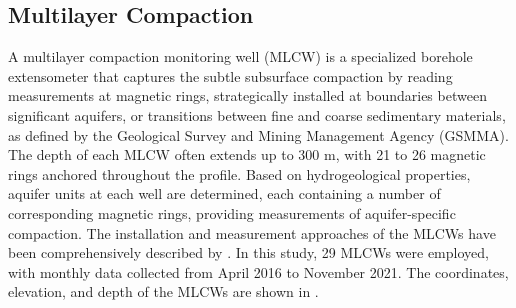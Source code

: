 
\subsection{Multilayer Compaction}
\label{subsubsec:mlcw}

A multilayer compaction monitoring well (MLCW) is a specialized borehole extensometer that captures the subtle subsurface compaction by reading measurements at magnetic rings, strategically installed at boundaries between significant aquifers, or transitions between fine and coarse sedimentary materials, as defined by the Geological Survey and Mining Management Agency (GSMMA).  The depth of each MLCW often extends up to 300 m, with 21 to 26 magnetic rings anchored throughout the profile. Based on hydrogeological properties, aquifer units at each well are determined, each containing a number of corresponding magnetic rings, providing measurements of aquifer-specific compaction. The installation and measurement approaches of the MLCWs have been comprehensively described by \citep{Hung2021_MLCW}. In this study, 29 MLCWs were employed, with monthly data collected from April 2016 to November 2021.  The coordinates, elevation, and depth of the MLCWs are shown in .


